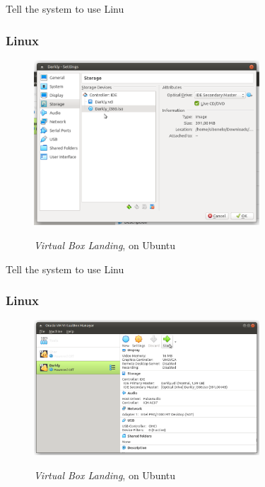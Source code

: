 Tell the system to use Linu
\subsubsection{Linux}

\begin{figure}[!htb]
    \centering
    \includegraphics[width=0.752\textwidth]{images/00-06.png}\\[0cm]  
    \caption[Virtual Box]{\emph{Virtual Box Landing}, on Ubuntu}
    \label{fig:00-06 - Linux Virtual Box Landing} 
\end{figure}

Tell the system to use Linu
\subsubsection{Linux}

\begin{figure}[!htb]
    \centering
    \includegraphics[width=0.752\textwidth]{images/00-07.png}\\[0cm]  
    \caption[Virtual Box]{\emph{Virtual Box Landing}, on Ubuntu}
    \label{fig:00-07 - Linux Virtual Box Landing} 
\end{figure}

